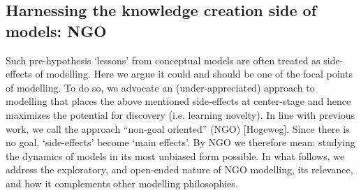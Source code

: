 \subsection{Harnessing the knowledge creation side of models: NGO}

Such pre-hypothesis `lessons' from conceptual models are often treated as side-effects of modelling.  Here we argue it could and should be one of the focal points of modelling. To do so, we advocate an (under-appreciated) approach to modelling that places the above mentioned side-effects at center-stage and hence maximizes the potential for discovery (i.e. learning novelty). In line with previous work, we call the approach ``non-goal oriented'' (NGO) [Hogeweg]. Since there is no goal, `side-effects' become `main effects'.  By NGO we therefore mean: studying the dynamics of models in its most unbiased form possible. In what follows, we address the exploratory, and open-ended nature of NGO modelling, its relevance, and how it complements other modelling philosophies.

  